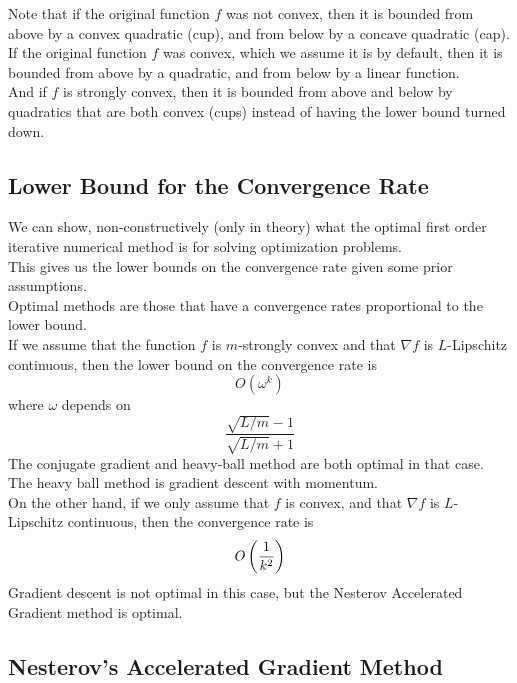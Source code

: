 \documentclass[12pt]{article}
\begin{document}
Note that if the original function $f$ was
not convex, then it is bounded from 
above by a convex quadratic (cup),
and from below by a concave quadratic (cap). \\

If the original function $f$ was
convex, which we assume it is by default,
then it is bounded from above by a quadratic,
and from below by a linear function. \\

And if $f$ is strongly convex, then it is
bounded from above and below by quadratics
that are both convex (cups)
instead of having the lower bound turned down. \\

\newpage

\subsection*{Lower Bound for the Convergence Rate}

We can show, non-constructively (only in theory)
what the optimal first order iterative
numerical method is for solving
optimization problems. \\

This gives us the lower bounds on the
convergence rate given some prior assumptions. \\

Optimal methods are those that have a convergence
rates proportional to the lower bound. \\

If we assume that the function $f$
is $m$-strongly convex and that $\nabla f$
is $L$-Lipschitz continuous,
then the lower bound on the convergence 
rate is 
\[ O(\omega^k)\] 
where $\omega$ depends on 
\[ \dfrac{\sqrt{L/m} - 1}{\sqrt{L/m} + 1} \]
The conjugate gradient and heavy-ball method
are both optimal in that case. \\

The heavy ball method is gradient descent 
with momentum. \\

On the other hand, if we only assume that $f$
is convex, and that $\nabla f$
is $L$-Lipschitz continuous,
then the convergence rate is 
\[ O\left( \dfrac{1}{k^2} \right) \]
Gradient descent is not optimal in this case,
but the Nesterov Accelerated Gradient method
is optimal. \\

\newpage

\subsection*{Nesterov's Accelerated Gradient
Method}
\end{document}
